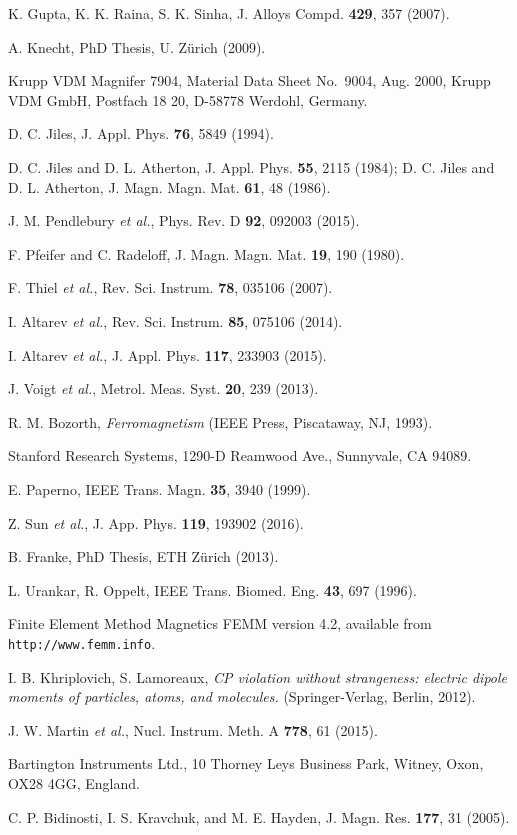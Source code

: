 \documentclass[review]{elsarticle}
\begin{document}
\begin{thebibliography}{00}
 K. Gupta, K. K. Raina, S. K. Sinha, J. Alloys
  Compd. {\bf 429}, 357 (2007).

 A. Knecht, PhD Thesis, U. Z\"urich (2009).

 Krupp VDM Magnifer 7904, Material Data Sheet
  No.~9004, Aug. 2000, Krupp VDM GmbH, Postfach 18 20, D-58778
  Werdohl, Germany.

 D. C. Jiles, J. Appl. Phys. {\bf 76}, 5849 (1994).

 D. C. Jiles and D. L. Atherton,
  J. Appl. Phys. {\bf 55}, 2115 (1984); D. C. Jiles and D. L. Atherton,
  J. Magn. Magn. Mat. {\bf 61}, 48 (1986).

 J. M. Pendlebury {\it et al.}, Phys. Rev. D {\bf 92}, 092003 (2015).

 F. Pfeifer and C. Radeloff,
  J. Magn. Magn. Mat. {\bf 19}, 190 (1980).

 F. Thiel {\it et al.}, Rev. Sci. Instrum. {\bf 78}, 035106 (2007).

 I. Altarev {\it et al.},
  Rev. Sci. Instrum. {\bf 85}, 075106 (2014).

 I. Altarev {\it et al.}, J. Appl. Phys. {\bf 117}, 233903 (2015).

 J. Voigt {\it et al.}, Metrol. Meas. Syst. {\bf 20}, 239 (2013).

 R. M. Bozorth, {\it Ferromagnetism} (IEEE Press,
  Piscataway, NJ, 1993).

 Stanford Research Systems, 1290-D Reamwood Ave.,
  Sunnyvale, CA 94089.

 E. Paperno, IEEE Trans. Magn. {\bf
  35}, 3940 (1999).

 Z. Sun {\it et al.}, J. App. Phys. {\bf
  119}, 193902 (2016).

 B. Franke, PhD Thesis, ETH Z\"urich (2013).

 L. Urankar, R. Oppelt, IEEE
  Trans. Biomed. Eng. {\bf 43}, 697 (1996).

 Finite Element Method Magnetics FEMM version 4.2,
  available from {\tt http://www.femm.info}.

 I. B. Khriplovich,
  S. Lamoreaux, {\it CP violation without strangeness: electric dipole
    moments of particles, atoms, and molecules.} (Springer-Verlag,
  Berlin, 2012).

 J. W. Martin {\it et al.},
  Nucl. Instrum. Meth. A {\bf 778}, 61 (2015).

 Bartington Instruments Ltd., 10 Thorney Leys
  Business Park, Witney, Oxon, OX28 4GG, England.

 C. P. Bidinosti, I. S. Kravchuk, and
  M. E. Hayden, J. Magn. Res. {\bf 177}, 31 (2005).

\end{thebibliography}
\end{document}

